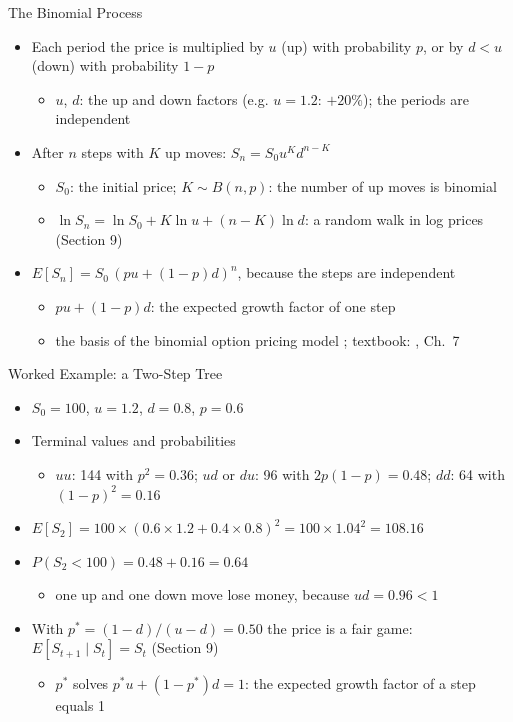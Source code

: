 \begin{frame}{The Binomial Process}
\itemsize{\footnotesize}
\begin{itemize}
    \item Each period the price is multiplied by $u$ (up) with probability $p$, or by $d < u$ (down) with probability $1 - p$
    \begin{itemize}
        \item $u$, $d$: the up and down factors (e.g. $u = 1.2$: $+20\%$); the periods are independent
    \end{itemize}
    \item After $n$ steps with $K$ up moves: $S_n = S_0 u^K d^{n - K}$
    \begin{itemize}
        \item $S_0$: the initial price; $K \sim B(n, p)$: the number of up moves is binomial
        \item $\ln S_n = \ln S_0 + K\ln u + (n - K)\ln d$: a random walk in log prices (Section 9)
    \end{itemize}
    \item $E[S_n] = S_0\,(pu + (1 - p)d)^n$, because the steps are independent
    \begin{itemize}
        \item $pu + (1 - p)d$: the expected growth factor of one step
        \item the basis of the binomial option pricing model ; textbook: , Ch.~7
    \end{itemize}
\end{itemize}
\end{frame}

\begin{frame}{Worked Example: a Two-Step Tree}
\itemsize{\footnotesize}
\begin{itemize}
    \item $S_0 = 100$, $u = 1.2$, $d = 0.8$, $p = 0.6$
    \item Terminal values and probabilities
    \begin{itemize}
        \item $uu$: 144 with $p^2 = 0.36$; $ud$ or $du$: 96 with $2p(1-p) = 0.48$; $dd$: 64 with $(1-p)^2 = 0.16$
    \end{itemize}
    \item $E[S_2] = 100 \times (0.6 \times 1.2 + 0.4 \times 0.8)^2 = 100 \times 1.04^2 = 108.16$
    \item $P(S_2 < 100) = 0.48 + 0.16 = 0.64$
    \begin{itemize}
        \item one up and one down move lose money, because $ud = 0.96 < 1$
    \end{itemize}
    \item With $p^* = (1 - d)/(u - d) = 0.50$ the price is a fair game: $E[S_{t+1} \mid S_t] = S_t$ (Section 9)
    \begin{itemize}
        \item $p^*$ solves $p^*u + (1 - p^*)d = 1$: the expected growth factor of a step equals 1
    \end{itemize}
\end{itemize}
\end{frame}

